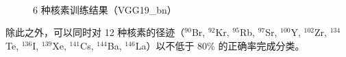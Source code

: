 \documentclass[AutoFakeBold]{LZUThesis}
\begin{document}
\begin{figure}[H]
	\centering
	\\	
    \caption{6 种核素训练结果（VGG19\_bn）}
    \label{fig_learn6_vgg19-bn}
\end{figure}

除此之外，可以同时对 12 种核素的径迹（$^{90}$Br, $^{92}$Kr, $^{95}$Rb, $^{97}$Sr, $^{100}$Y, $^{102}$Zr, $^{134}$Te, $^{136}$I, $^{139}$Xe, $^{141}$Cs, $^{144}$Ba, $^{146}$La）以不低于 80\% 的正确率完成分类。
\end{document}
